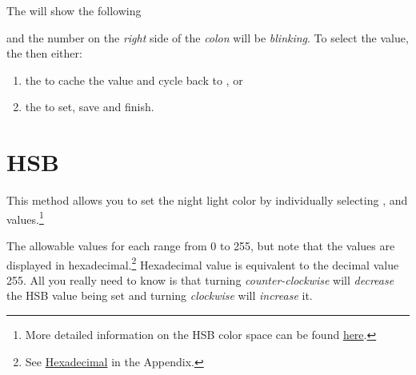 The  will show the following

\begin{figure}[H]
\centering
\end{figure}

and the number on the \textit{right} side of the \textit{colon} will be
\textit{blinking}.  To select the  value,  the  then
either:

\begin{enumerate}
\item {} the  to cache the value and cycle back to , or
\item {} the  to set, save and finish.
\end{enumerate}


\section{HSB} 

This method allows you to set the night light color by individually selecting
,  and  values.\footnote{ More detailed
information on the HSB color space can be found
\href{https://en.wikipedia.org/wiki/HSL\_and\_HSV}{here}.}

\par\medskip

The allowable values for each range from \num{0} to \num{255}, but note that the
values are displayed in hexadecimal.\footnote{ See
\hyperref[Hexadecimal]{Hexadecimal} in the Appendix.} Hexadecimal value
 is equivalent to the decimal value \num{255}. All you really need to
know is that turning \textit{counter-clockwise} will \textit{decrease} the
HSB value being set and turning \textit{clockwise} will \textit{increase} it.

